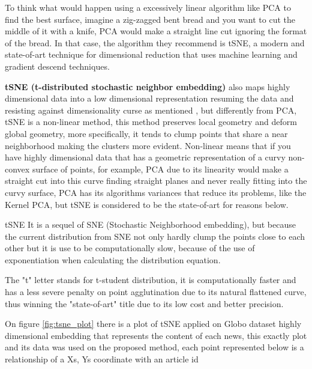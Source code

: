 \documentclass[ecp,tc,english]{iiufrgs}
\begin{document}
    To think what would happen using a excessively linear algorithm like PCA to find the best surface, imagine a zig-zagged bent bread and you want to cut the middle of it with a knife, PCA would make a straight line cut ignoring the format of the bread. In that case, the algorithm they recommend is tSNE, a modern and state-of-art technique for dimensional reduction that uses machine learning and gradient descend techniques.
    
    \textbf{tSNE (t-distributed stochastic neighbor embedding)} also maps highly dimensional data into a low dimensional representation resuming the data and resisting against dimensionality curse as mentioned \cite{marimont1979}, but differently from PCA, tSNE \cite{maaten2008} is a non-linear method, this method preserves local geometry and deform global geometry, more specifically, it tends to clump points that share a near neighborhood making the clusters more evident.
    Non-linear means that if you have highly dimensional data that has a geometric representation of a curvy non-convex surface of points, for example, PCA due to its linearity would make a straight cut into this curve finding straight planes and never really fitting into the curvy surface, PCA has its algorithms variances that reduce its problems, like the Kernel PCA, but tSNE is considered to be the state-of-art for reasons below.

    tSNE It is a sequel of SNE (Stochastic Neighborhood embedding), but because the current distribution from SNE not only hardly clump the points close to each other but it is use to be computationally slow, because of the use of exponentiation when calculating the distribution equation.
    
    The "t" letter stands for t-student distribution, it is computationally faster and has a less severe penalty on point agglutination due to its natural flattened curve, thus winning the "state-of-art" title due to its low cost and better precision.

    On figure \ref{fig:tsne_plot} there is a plot of tSNE applied on Globo dataset highly dimensional embedding that represents the content of each news, this exactly plot and its data was used on the proposed method, each point represented below is a relationship of a Xs, Ys coordinate with an article id 
\end{document}
